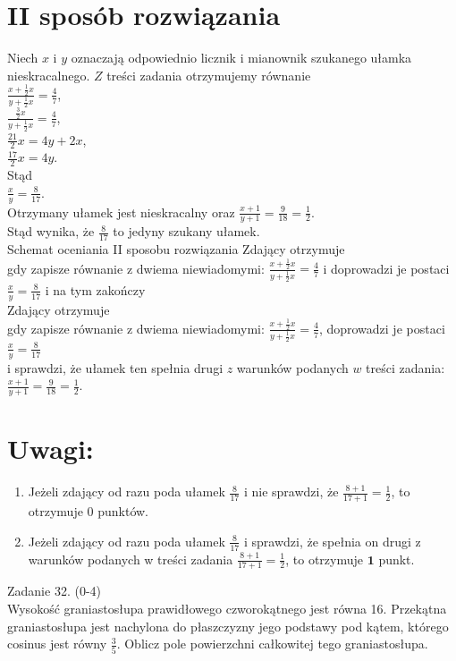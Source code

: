 \documentclass[10pt]{article}
\begin{document}
\section*{II sposób rozwiązania}
Niech $x$ i $y$ oznaczają odpowiednio licznik i mianownik szukanego ułamka nieskracalnego. $Z$ treści zadania otrzymujemy równanie\\
$\frac{x+\frac{1}{2} x}{y+\frac{1}{2} x}=\frac{4}{7}$,\\
$\frac{\frac{3}{2} x}{y+\frac{1}{2} x}=\frac{4}{7}$,\\
$\frac{21}{2} x=4 y+2 x$,\\
$\frac{17}{2} x=4 y$.\\
Stąd\\
$\frac{x}{y}=\frac{8}{17}$.\\
Otrzymany ułamek jest nieskracalny oraz $\frac{x+1}{y+1}=\frac{9}{18}=\frac{1}{2}$.\\
Stąd wynika, że $\frac{8}{17}$ to jedyny szukany ułamek.\\
Schemat oceniania II sposobu rozwiązania Zdający otrzymuje\\
gdy zapisze równanie z dwiema niewiadomymi: $\frac{x+\frac{1}{2} x}{y+\frac{1}{2} x}=\frac{4}{7}$ i doprowadzi je postaci $\frac{x}{y}=\frac{8}{17}$ i na tym zakończy\\
Zdający otrzymuje\\
gdy zapisze równanie z dwiema niewiadomymi: $\frac{x+\frac{1}{2} x}{y+\frac{1}{2} x}=\frac{4}{7}$, doprowadzi je postaci $\frac{x}{y}=\frac{8}{17}$\\
i sprawdzi, że ułamek ten spełnia drugi $z$ warunków podanych $w$ treści zadania: $\frac{x+1}{y+1}=\frac{9}{18}=\frac{1}{2}$.

\section*{Uwagi:}
\begin{enumerate}
  \item Jeżeli zdający od razu poda ułamek $\frac{8}{17}$ i nie sprawdzi, że $\frac{8+1}{17+1}=\frac{1}{2}$, to otrzymuje 0 punktów.
  \item Jeżeli zdający od razu poda ułamek $\frac{8}{17}$ i sprawdzi, że spełnia on drugi z warunków podanych w treści zadania $\frac{8+1}{17+1}=\frac{1}{2}$, to otrzymuje $\mathbf{1}$ punkt.
\end{enumerate}

Zadanie 32. (0-4)\\
Wysokość graniastosłupa prawidłowego czworokątnego jest równa 16. Przekątna graniastosłupa jest nachylona do płaszczyzny jego podstawy pod kątem, którego cosinus jest równy $\frac{3}{5}$. Oblicz pole powierzchni całkowitej tego graniastosłupa.
\end{document}
